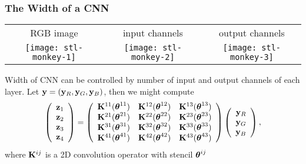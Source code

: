 \documentclass[12pt,fleqn,handout]{beamer}
\begin{document}
\begin{frame}\frametitle{The Width of a CNN}
	
	\begin{center}
		\begin{tabular}{ccc}
			RGB image & input channels & output channels\\ 
			\texttt{[image: stl-monkey-1]}
			&
			\texttt{[image: stl-monkey-2]}
			&
			\texttt{[image: stl-monkey-3]}
		\end{tabular}
	\end{center}
	\pause
	
	Width of CNN can be controlled by number of input and output channels of each layer. Let ${\bf y} = ({\bf y}_R, {\bf y}_G, {\bf y}_B)$, then we might compute
	$$
		\left(
			\begin{array}{r}
				{\bf z}_1 \\
				{\bf z}_2 \\
				{\bf z}_3 \\
				{\bf z}_4
			\end{array}
		\right)
		= 
		\left(
		\begin{array}{rrr}
			{\bf K}^{11}({\boldsymbol \theta}^{11}) &  {\bf K}^{12}({\boldsymbol \theta}^{12}) & {\bf K}^{13}({\boldsymbol \theta}^{13})\\
			{\bf K}^{21}({\boldsymbol \theta}^{21}) &  {\bf K}^{22}({\boldsymbol \theta}^{22}) & {\bf K}^{23}({\boldsymbol \theta}^{23})\\
			{\bf K}^{31}({\boldsymbol \theta}^{31}) &  {\bf K}^{32}({\boldsymbol \theta}^{32}) & {\bf K}^{33}({\boldsymbol \theta}^{33})\\
			{\bf K}^{41}({\boldsymbol \theta}^{41}) &  {\bf K}^{42}({\boldsymbol \theta}^{42}) & {\bf K}^{43}({\boldsymbol \theta}^{43})\\
		\end{array}
		\right)
		\left(
			\begin{array}{r}
				{\bf y}_R \\
				{\bf y}_G \\
				{\bf y}_B 
			\end{array}
		\right),
	$$
	where ${\bf K}^{ij}$ is a 2D convolution operator with stencil ${\boldsymbol \theta}^{ij}$
	
\end{frame}
\end{document}
